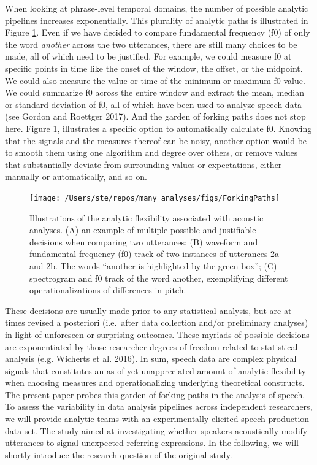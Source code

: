 \documentclass[
  12pt,
]{article}
\begin{document}
When looking at phrase-level temporal domains, the number of possible analytic pipelines increases exponentially.
This plurality of analytic paths is illustrated in Figure \ref{fig:forkingPaths}.
Even if we have decided to compare fundamental frequency (f0) of only the word \emph{another} across the two utterances, there are still many choices to be made, all of which need to be justified.
For example, we could measure f0 at specific points in time like the onset of the window, the offset, or the midpoint.
We could also measure the value or time of the minimum or maximum f0 value.
We could summarize f0 across the entire window and extract the mean, median or standard deviation of f0, all of which have been used to analyze speech data (see Gordon and Roettger 2017).
And the garden of forking paths does not stop here.
Figure \ref{fig:forkingPaths}, illustrates a specific option to automatically calculate f0.
Knowing that the signals and the measures thereof can be noisy, another option would be to smooth them using one algorithm and degree over others, or remove values that substantially deviate from surrounding values or expectations, either manually or automatically, and so on.



\begin{figure}
\texttt{[image: /Users/ste/repos/many\_analyses/figs/ForkingPaths]} \caption{Illustrations of the analytic flexibility associated with acoustic analyses. (A) an example of multiple possible and justifiable decisions when comparing two utterances; (B) waveform and fundamental frequency (f0) track of two instances of utterances 2a and 2b. The words ``another is highlighted by the green box''; (C) spectrogram and f0 track of the word another, exemplifying different operationalizations of differences in pitch.}\label{fig:forkingPaths}
\end{figure}

These decisions are usually made prior to any statistical analysis, but are at times revised a posteriori (i.e.~after data collection and/or preliminary analyses) in light of unforeseen or surprising outcomes.
These myriads of possible decisions are exponentiated by those researcher degrees of freedom related to statistical analysis (e.g. Wicherts et al. 2016).
In sum, speech data are complex physical signals that constitutes an as of yet unappreciated amount of analytic flexibility when choosing measures and operationalizing underlying theoretical constructs.
The present paper probes this garden of forking paths in the analysis of speech.
To assess the variability in data analysis pipelines across independent researchers, we will provide analytic teams with an experimentally elicited speech production data set.
The study aimed at investigating whether speakers acoustically modify utterances to signal unexpected referring expressions.
In the following, we will shortly introduce the research question of the original study.
\end{document}
